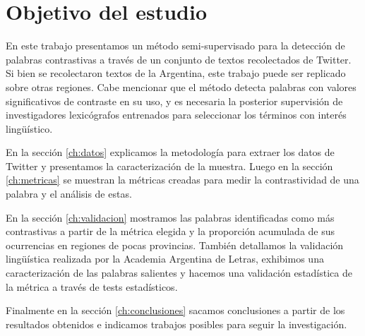 
\section{Objetivo del estudio}

En este trabajo presentamos un método semi-supervisado para la detección de palabras contrastivas a través de un conjunto de textos recolectados de Twitter. Si bien se recolectaron textos de la Argentina, este trabajo puede ser replicado sobre otras regiones. Cabe mencionar que el método detecta palabras con valores significativos de contraste en su uso, y es necesaria la posterior supervisión de investigadores lexicógrafos entrenados para seleccionar los términos con interés lingüístico.

En la sección \ref{ch:datos} explicamos la metodología para extraer los datos de Twitter y presentamos la caracterización de la muestra. 
Luego en la sección \ref{ch:metricas} se muestran la métricas creadas para medir la contrastividad de una palabra y el análisis de estas.

En la sección \ref{ch:validacion} mostramos las palabras identificadas como más contrastivas a partir de la métrica elegida y la proporción acumulada de sus ocurrencias en regiones de pocas provincias. 
También detallamos la validación lingüística realizada por la Academia Argentina de Letras, exhibimos una caracterización de las palabras salientes y hacemos una validación estadística de la métrica a través de tests estadísticos. 

Finalmente en la sección \ref{ch:conclusiones} sacamos conclusiones a partir de los resultados obtenidos e indicamos trabajos posibles para seguir la investigación.

